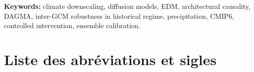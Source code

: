 \documentclass[14pt,a4paper,openany]{extreport}
\begin{document}
\noindent\textbf{Keywords:} climate downscaling, diffusion models, EDM, architectural causality, DAGMA, inter-GCM robustness in historical regime, precipitation, CMIP6, controlled intervention, ensemble calibration.

\endgroup

\clearpage
\chapter*{Liste des abréviations et sigles}
\end{document}
